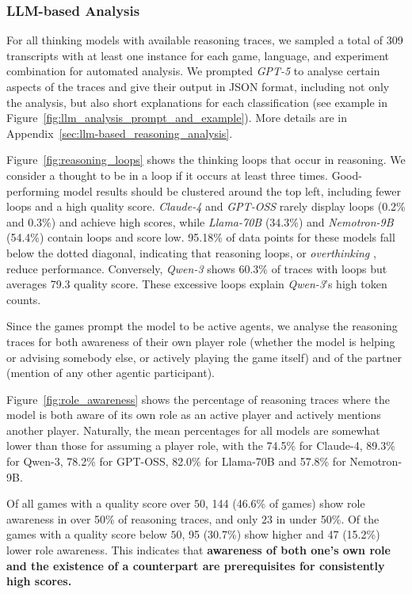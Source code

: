 \documentclass[11pt]{article}
\begin{document}
\subsubsection{LLM-based Analysis}

For all thinking models with available reasoning traces, we sampled a total of 309 transcripts with at least one instance for each game, language, and experiment combination for automated analysis. We prompted \textit{GPT-5} to analyse certain aspects of the traces and give their output in JSON format, including not only the analysis, but also short explanations for each classification (see example in Figure~\ref{fig:llm_analysis_prompt_and_example}). More details are in Appendix~\ref{sec:llm-based_reasoning_analysis}.

Figure~\ref{fig:reasoning_loops} shows the thinking loops that occur in reasoning. We consider a thought to be in a loop if it occurs at least three times. Good-performing model results should be clustered around the top left, including fewer loops and a high quality score. \textit{Claude-4} and \textit{GPT-OSS} rarely display loops (0.2\% and 0.3\%) and achieve high scores, while \textit{Llama-70B} (34.3\%) and \textit{Nemotron-9B} (54.4\%) contain loops and score low. 95.18\% of data points for these models fall below the dotted diagonal, indicating that reasoning loops, or \textit{overthinking} \cite{DBLP:journals/corr/abs-2506-06941}, reduce performance.
Conversely, \textit{Qwen-3} shows 60.3\% of traces with loops but averages 79.3 quality score. These excessive loops explain \textit{Qwen-3}'s high token counts.

Since the games prompt the model to be active agents, we analyse the reasoning traces for both awareness of their own player role (whether the model is helping or advising somebody else, or actively playing the game itself) and of the partner (mention of any other agentic participant). 

Figure~\ref{fig:role_awareness} shows the percentage of reasoning traces where the model is both aware of its own role as an active player and actively mentions another player. Naturally, the mean percentages for all models are somewhat lower than those for assuming a player role, with the 74.5\% for Claude-4, 89.3\% for Qwen-3, 78.2\% for GPT-OSS, 82.0\% for Llama-70B and 57.8\% for Nemotron-9B.

Of all games with a quality score over $50$, 144 (46.6\% of games) show role awareness in over 50\% of reasoning traces, and only $23$ in under 50\%. Of the games with a quality score below $50$, 95 (30.7\%) show higher and 47 (15.2\%) lower role awareness. This indicates that \textbf{awareness of both one's own role and the existence of a counterpart are prerequisites for consistently high scores.}
\end{document}
